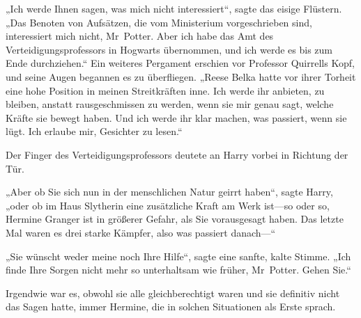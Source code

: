 „Ich werde Ihnen sagen, was mich nicht interessiert“, sagte das eisige Flüstern.
„Das Benoten von Aufsätzen, die vom Ministerium vorgeschrieben sind, interessiert mich nicht, Mr~Potter. Aber ich habe das Amt des Verteidigungsprofessors in Hogwarts übernommen, und ich werde es bis zum Ende durchziehen.“ Ein weiteres Pergament erschien vor Professor Quirrells Kopf, und seine Augen begannen es zu überfliegen.
„Reese Belka hatte vor ihrer Torheit eine hohe Position in meinen Streitkräften inne. Ich werde ihr anbieten, zu bleiben, anstatt rausgeschmissen zu werden, wenn sie mir genau sagt, welche Kräfte sie bewegt haben. Und ich werde ihr klar machen, was passiert, wenn sie lügt. Ich erlaube mir, Gesichter zu lesen.“

Der Finger des Verteidigungsprofessors deutete an Harry vorbei in Richtung der Tür.

„Aber ob Sie sich nun in der menschlichen Natur geirrt haben“, sagte Harry, „oder ob im Haus Slytherin eine zusätzliche Kraft am Werk ist—so oder so, Hermine Granger ist in größerer Gefahr, als Sie vorausgesagt haben. Das letzte Mal waren es drei starke Kämpfer, also was passiert danach—“

„Sie wünscht weder meine noch Ihre Hilfe“, sagte eine sanfte, kalte Stimme.
„Ich finde Ihre Sorgen nicht mehr so unterhaltsam wie früher, Mr~Potter. Gehen Sie.“

\later

Irgendwie war es, obwohl sie alle gleichberechtigt waren und sie definitiv nicht das Sagen hatte, immer Hermine, die in solchen Situationen als Erste sprach.

